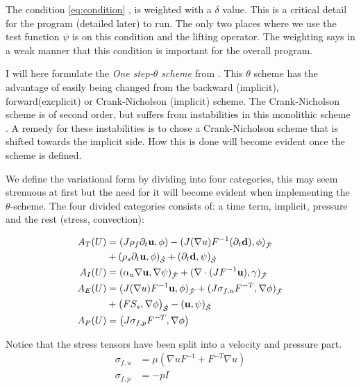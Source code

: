The condition \eqref{eq:condition} , is weighted with a $\delta$ value. This is a critical detail for the program (detailed later) to run. The only two places where we use the test function $\psi$ is on this condition and the lifting operator. The weighting says in a weak manner that this condition is important for the overall program. \newline

I will here formulate the \textit{One step-$\theta$ scheme} from \cite{Wick2011}. This $\theta$ scheme has the advantage of easily being changed from the backward (implicit), forward(excplicit) or Crank-Nicholson (implicit) scheme. The Crank-Nicholson scheme is of second order, but suffers from instabilities in this monolithic scheme \cite{Wick2011}. A remedy for these instabilities is to chose a Crank-Nicholson scheme that is shifted towards the implicit side. How this is done will become evident once the scheme is defined.

We define the variational form by dividing into four categories, this may seem strenuous at first but the need for it will become evident when implementing the $\theta$-scheme. The four divided categories consists of: a time term, implicit, pressure and the rest (stress, convection):

\begin{align}
A_T(U) &= (J \rho_f \partial_t \bold{u} , \phi ) - (J (\nabla u)F^{-1}(\partial_t \bold{d}) , \phi )_{\mathcal{\hat{F}}} \\
	    & + (\rho_s \partial_t \bold{u} , \phi)_{\mathcal{\hat{S}}} + (\partial_t \bold{d} , \psi)_{\mathcal{\hat{S}}}  \\
A_I(U) &= ( \alpha_u \nabla \bold{u}, \nabla \psi)_{\mathcal{\hat{F}}} + (\nabla \cdot (J F^{-1} \bold{u}), \gamma)_{\mathcal{\hat{F}}} \\
A_E(U) &= (J (\nabla u)F^{-1} \bold{u} , \phi )_{\mathcal{\hat{F}}} + ( J \sigma_{f,u} F^{-T} , \nabla \phi )_{\mathcal{\hat{F}}} \\
	    & + \big(F S_s, \nabla \phi \big)_{\mathcal{\hat{S}}} - ( \bold{u} , \psi )_{\mathcal{\hat{S}}} \\
A_P(U) &= \big( J \sigma_{f,p} F^{-T}, \nabla \phi  \big)  	 		
\end{align}

Notice that the stress tensors have been split into a velocity and pressure part. 
\begin{align}
\sigma_{f,u} &= \mu ( \nabla u F^{-1} + F^{-T} \nabla u) \\
\sigma_{f,p} &= -p I
\end{align}

